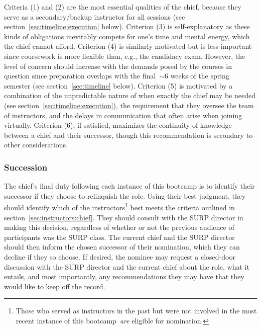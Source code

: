 Criteria (1) and (2) are the most essential qualities of the chief, because
they serve as a secondary/backup instructor for all sessions (see
section~\ref{sec:timeline:execution} below).
Criterion (3) is self-explanatory as these kinds of obligations inevitably
compete for one's time and mental energy, which the chief cannot afford.
Criterion (4) is similarly motivated but is less important since coursework is
more flexible than, e.g., the candidacy exam.
However, the level of concern should increase with the demands posed by the
courses in question since preparation overlaps with the final~$\sim$6 weeks of
the spring semester (see section~\ref{sec:timeline} below).
Criterion (5) is motivated by a combination of the unpredictable nature of when
exactly the chief may be needed (see section~\ref{sec:timeline:execution}), the
requirement that they oversee the team of instructors, and the delays in
communication that often arise when joining virtually.
Criterion (6), if satisfied, maximizes the continuity of knowledge between a
chief and their successor, though this recommendation is secondary to other
considerations.

\subsubsection{Succession}
\label{sec:instructors:chief:succession}
\noindent
The chief’s final duty following each instance of this bootcamp is to identify
their successor if they choose to relinquish the role.
Using their best judgment, they should identify which of the
instructors\footnote{
	Those who served as instructors in the past but were not involved in the
	most recent instance of this bootcamp~\textit{are} eligible for nomination.
} best meets the criteria outlined in section~\ref{sec:instructors:chief}.
They should consult with the SURP director in making this decision, regardless
of whether or not the previous audience of participants was the SURP class.
The current chief and the SURP director should then inform the chosen successor
of their nomination, which they can decline if they so choose.
If desired, the nominee may request a closed-door discussion with the SURP
director and the current chief about the role, what it entails, and most
importantly, any recommendations they may have that they would like to keep off
the record.

